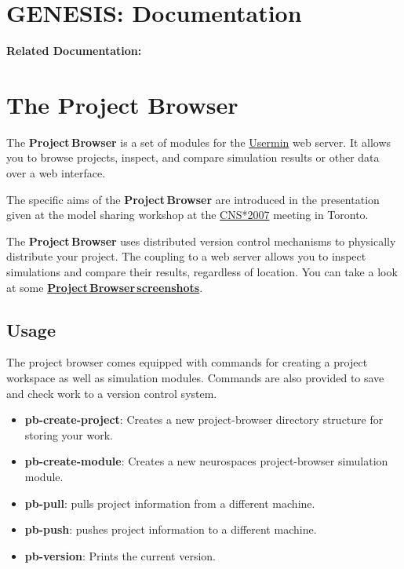 \documentclass[12pt]{article}
\begin{document}
\section*{GENESIS: Documentation}

{\bf Related Documentation:}

\section*{The Project Browser}

The {\bf Project\,Browser} is a set of modules for the \href{http://www.webmin.com/usermin.html}{Usermin} web server. It allows you to browse projects, inspect, and compare simulation results or other data over a web interface.

The specific aims of the {\bf Project\,Browser} are introduced in the presentation given at the model sharing workshop at the \href{../cns07-poster/cns07-poster.pdf}{CNS*2007} meeting in Toronto.

The {\bf Project\,Browser} uses distributed version control mechanisms to physically distribute your project. The coupling to a web server allows you to inspect simulations and compare their results, regardless of location. You can take a look at some \href{../project-browser-screenshots/project-browser-screenshots.tex}{\bf Project\,Browser\,screenshots}. 

\subsection*{Usage}

The project browser comes equipped with commands for creating a project workspace as well as simulation modules. Commands are also provided to save and check work to a version control system.

\begin{itemize}
\item[] {\bf pb-create-project}: Creates a new project-browser directory structure for storing your work.
\item[] {\bf pb-create-module}: Creates a new neurospaces project-browser simulation module.
\item[] {\bf pb-pull}: pulls project information from a different machine.
\item[] {\bf pb-push}: pushes project information to a different machine.
\item[] {\bf pb-version}: Prints the current version. 
\end{itemize}
\end{document}
